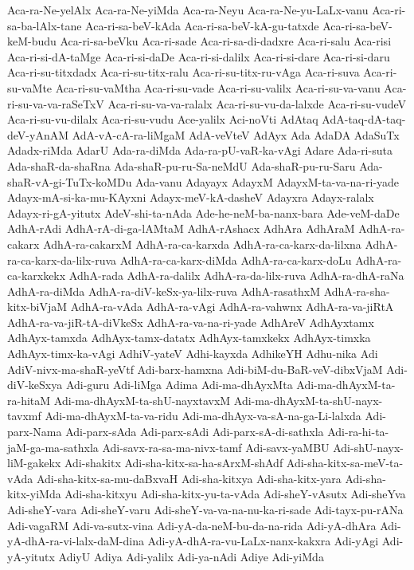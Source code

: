 {Aca-ra-Ne-yelAlx
Aca-ra-Ne-yiMda
Aca-ra-Neyu
Aca-ra-Ne-yu-LaLx-vanu
Aca-ri-sa-ba-lAlx-tane
Aca-ri-sa-beV-kAda
Aca-ri-sa-beV-kA-gu-tatxde
Aca-ri-sa-beV-keM-budu
Aca-ri-sa-beVku
Aca-ri-sade
Aca-ri-sa-di-dadxre
Aca-ri-salu
Aca-risi
Aca-ri-si-dA-taMge
Aca-ri-si-daDe
Aca-ri-si-dalilx
Aca-ri-si-dare
Aca-ri-si-daru
Aca-ri-su-titxdadx
Aca-ri-su-titx-ralu
Aca-ri-su-titx-ru-vAga
Aca-ri-suva
Aca-ri-su-vaMte
Aca-ri-su-vaMtha
Aca-ri-su-vade
Aca-ri-su-valilx
Aca-ri-su-va-vanu
Aca-ri-su-va-va-raSeTxV
Aca-ri-su-va-va-ralalx
Aca-ri-su-vu-da-lalxde
Aca-ri-su-vudeV
Aca-ri-su-vu-dilalx
Aca-ri-su-vudu
Ace-yalilx
Aci-noVti
AdAtaq
AdA-taq-dA-taq-deV-yAnAM
AdA-vA-cA-ra-liMgaM
AdA-veVteV
AdAyx
Ada
AdaDA
AdaSuTx
Adadx-riMda
AdarU
Ada-ra-diMda
Ada-ra-pU-vaR-ka-vAgi
Adare
Ada-ri-suta
Ada-shaR-da-shaRna
Ada-shaR-pu-ru-Sa-neMdU
Ada-shaR-pu-ru-Saru
Ada-shaR-vA-gi-TuTx-koMDu
Ada-vanu
Adayayx
AdayxM
AdayxM-ta-va-na-ri-yade
Adayx-mA-si-ka-mu-KAyxni
Adayx-meV-kA-dasheV
Adayxra
Adayx-ralalx
Adayx-ri-gA-yitutx
AdeV-shi-ta-nAda
Ade-he-neM-ba-nanx-bara
Ade-veM-daDe
AdhA-rAdi
AdhA-rA-di-ga-lAMtaM
AdhA-rAshacx
AdhAra
AdhAraM
AdhA-ra-cakarx
AdhA-ra-cakarxM
AdhA-ra-ca-karxda
AdhA-ra-ca-karx-da-lilxna
AdhA-ra-ca-karx-da-lilx-ruva
AdhA-ra-ca-karx-diMda
AdhA-ra-ca-karx-doLu
AdhA-ra-ca-karxkekx
AdhA-rada
AdhA-ra-dalilx
AdhA-ra-da-lilx-ruva
AdhA-ra-dhA-raNa
AdhA-ra-diMda
AdhA-ra-diV-keSx-ya-lilx-ruva
AdhA-rasathxM
AdhA-ra-sha-kitx-biVjaM
AdhA-ra-vAda
AdhA-ra-vAgi
AdhA-ra-vahwnx
AdhA-ra-va-jiRtA
AdhA-ra-va-jiR-tA-diVkeSx
AdhA-ra-va-na-ri-yade
AdhAreV
AdhAyxtamx
AdhAyx-tamxda
AdhAyx-tamx-datatx
AdhAyx-tamxkekx
AdhAyx-timxka
AdhAyx-timx-ka-vAgi
AdhiV-yateV
Adhi-kayxda
AdhikeYH
Adhu-nika
Adi
AdiV-nivx-ma-shaR-yeVtf
Adi-barx-hamxna
Adi-biM-du-BaR-veV-dibxVjaM
Adi-diV-keSxya
Adi-guru
Adi-liMga
Adima
Adi-ma-dhAyxMta
Adi-ma-dhAyxM-ta-ra-hitaM
Adi-ma-dhAyxM-ta-shU-nayxtavxM
Adi-ma-dhAyxM-ta-shU-nayx-tavxmf
Adi-ma-dhAyxM-ta-va-ridu
Adi-ma-dhAyx-va-sA-na-ga-Li-lalxda
Adi-parx-Nama
Adi-parx-sAda
Adi-parx-sAdi
Adi-parx-sA-di-sathxla
Adi-ra-hi-ta-jaM-ga-ma-sathxla
Adi-savx-ra-sa-ma-nivx-tamf
Adi-savx-yaMBU
Adi-shU-nayx-liM-gakekx
Adi-shakitx
Adi-sha-kitx-sa-ha-sArxM-shAdf
Adi-sha-kitx-sa-meV-ta-vAda
Adi-sha-kitx-sa-mu-daBxvaH
Adi-sha-kitxya
Adi-sha-kitx-yara
Adi-sha-kitx-yiMda
Adi-sha-kitxyu
Adi-sha-kitx-yu-ta-vAda
Adi-sheY-vAsutx
Adi-sheYva
Adi-sheY-vara
Adi-sheY-varu
Adi-sheY-va-va-na-nu-ka-ri-sade
Adi-tayx-pu-rANa
Adi-vagaRM
Adi-va-sutx-vina
Adi-yA-da-neM-bu-da-na-rida
Adi-yA-dhAra
Adi-yA-dhA-ra-vi-lalx-daM-dina
Adi-yA-dhA-ra-vu-LaLx-nanx-kakxra
Adi-yAgi
Adi-yA-yitutx
AdiyU
Adiya
Adi-yalilx
Adi-ya-nAdi
Adiye
Adi-yiMda
}
